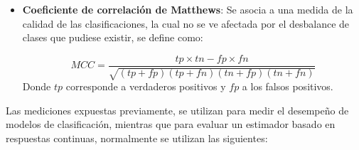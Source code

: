 \begin{itemize}
	\item \textbf{Coeficiente de correlación de Matthews}: Se asocia a una medida de la calidad de las clasificaciones, la cual no se ve afectada por el desbalance de clases que pudiese existir, se define como: 
	
	\begin{equation}
		MCC = \frac{tp \times tn - fp \times fn}{\sqrt{(tp + fp)(tp + fn)(tn + fp)(tn + fn)}}
	\end{equation}
	Donde $tp$ corresponde a verdaderos positivos y $fp$ a los falsos positivos.
	
\end{itemize}
	
Las mediciones expuestas previamente, se utilizan para medir el desempeño de modelos de clasificación, mientras que para evaluar un estimador basado en respuestas continuas, normalmente se utilizan las siguientes:
	
